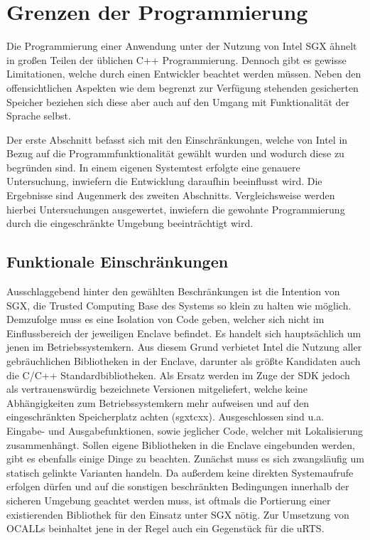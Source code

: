 \section{Grenzen der Programmierung}

Die Programmierung einer Anwendung unter der Nutzung von Intel SGX ähnelt in großen Teilen der üblichen C++ Programmierung. Dennoch gibt es gewisse Limitationen, welche durch einen Entwickler beachtet werden müssen. Neben den offensichtlichen Aspekten wie dem begrenzt zur Verfügung stehenden gesicherten Speicher beziehen sich diese aber auch auf den Umgang mit Funktionalität der Sprache selbst. 

Der erste Abschnitt befasst sich mit den Einschränkungen, welche von Intel in Bezug auf die Programmfunktionalität gewählt wurden und wodurch diese zu begründen sind. In einem eigenen Systemtest erfolgte eine genauere Untersuchung, inwiefern die Entwicklung daraufhin beeinflusst wird. Die Ergebnisse sind Augenmerk des zweiten Abschnitts. Vergleichsweise werden hierbei Untersuchungen ausgewertet, inwiefern die gewohnte Programmierung durch die eingeschränkte Umgebung beeinträchtigt wird.

\subsection{Funktionale Einschränkungen}

Ausschlaggebend hinter den gewählten Beschränkungen ist die Intention von SGX, die Trusted Computing Base des Systems so klein zu halten wie möglich. Demzufolge muss es eine Isolation von Code geben, welcher sich nicht im Einflussbereich der jeweiligen Enclave befindet. Es handelt sich hauptsächlich um jenen im Betriebssystemkern. Aus diesem Grund verbietet Intel die Nutzung aller gebräuchlichen Bibliotheken in der Enclave, darunter als größte Kandidaten auch die C/C++ Standardbibliotheken. Als Ersatz werden im Zuge der SDK jedoch als vertrauenswürdig bezeichnete Versionen mitgeliefert, welche keine Abhängigkeiten zum Betriebssystemkern mehr aufweisen und auf den eingeschränkten Speicherplatz achten (sgx\textunderscore tcxx). Ausgeschlossen sind u.a. Eingabe- und Ausgabefunktionen, sowie jeglicher Code, welcher mit Lokalisierung zusammenhängt. Sollen eigene Bibliotheken in die Enclave eingebunden werden, gibt es ebenfalls einige Dinge zu beachten. Zunächst muss es sich zwangsläufig um statisch gelinkte Varianten handeln. Da außerdem keine direkten Systemaufrufe erfolgen dürfen und auf die sonstigen beschränkten Bedingungen innerhalb der sicheren Umgebung geachtet werden muss, ist oftmals die Portierung einer existierenden Bibliothek für den Einsatz unter SGX nötig. Zur Umsetzung von OCALLs beinhaltet jene in der Regel auch ein Gegenstück für die uRTS.
 
